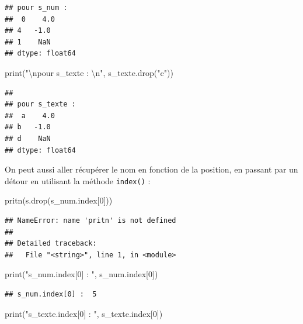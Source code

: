 \documentclass[12pt,]{book}
\newenvironment{Shaded}{\begin{snugshade}}{\end{snugshade}}
\newcommand{\DecValTok}[1]{\textcolor[rgb]{0.00,0.00,0.81}{#1}}
\newcommand{\CharTok}[1]{\textcolor[rgb]{0.31,0.60,0.02}{#1}}
\newcommand{\StringTok}[1]{\textcolor[rgb]{0.31,0.60,0.02}{#1}}
\newcommand{\BuiltInTok}[1]{#1}
\newcommand{\NormalTok}[1]{#1}
\numberwithin{equation}{section}
\numberwithin{countremarque}{section}
\begin{document}
\begin{lstlisting}
## pour s_num : 
##  0    4.0
## 4   -1.0
## 1    NaN
## dtype: float64
\end{lstlisting}

\begin{Shaded}
\begin{Highlighting}[]
\BuiltInTok{print}\NormalTok{(}\StringTok{"}\CharTok{\textbackslash{}n}\StringTok{pour s_texte : }\CharTok{\textbackslash{}n}\StringTok{"}\NormalTok{, s_texte.drop(}\StringTok{"c"}\NormalTok{))}
\end{Highlighting}
\end{Shaded}

\begin{lstlisting}
## 
## pour s_texte : 
##  a    4.0
## b   -1.0
## d    NaN
## dtype: float64
\end{lstlisting}

On peut aussi aller récupérer le nom en fonction de la position, en
passant par un détour en utilisant la méthode \texttt{index()} :

\begin{Shaded}
\begin{Highlighting}[]
\NormalTok{pritn(s.drop(s_num.index[}\DecValTok{0}\NormalTok{]))}
\end{Highlighting}
\end{Shaded}

\begin{lstlisting}
## NameError: name 'pritn' is not defined
## 
## Detailed traceback: 
##   File "<string>", line 1, in <module>
\end{lstlisting}

\begin{Shaded}
\begin{Highlighting}[]
\BuiltInTok{print}\NormalTok{(}\StringTok{"s_num.index[0] : "}\NormalTok{, s_num.index[}\DecValTok{0}\NormalTok{])}
\end{Highlighting}
\end{Shaded}

\begin{lstlisting}
## s_num.index[0] :  5
\end{lstlisting}

\begin{Shaded}
\begin{Highlighting}[]
\BuiltInTok{print}\NormalTok{(}\StringTok{"s_texte.index[0] : "}\NormalTok{, s_texte.index[}\DecValTok{0}\NormalTok{])}
\end{Highlighting}
\end{Shaded}
\end{document}
